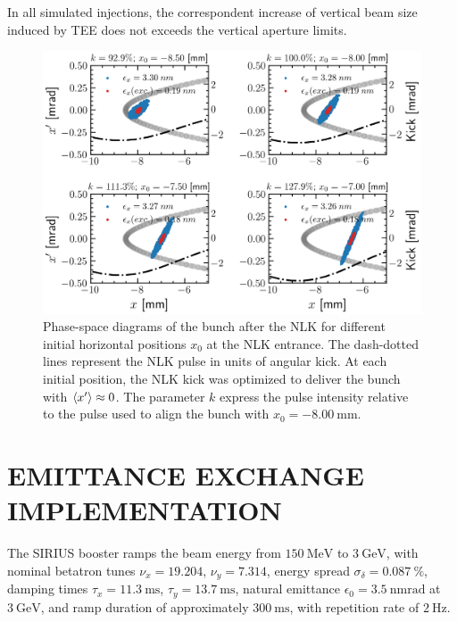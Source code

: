 \documentclass[a4paper,
               keeplastbox,   %
              nospread,     %
               ]{jacow}
\begin{document}
In all simulated injections, the correspondent increase of vertical beam size induced by TEE does not exceeds the vertical aperture limits.
\begin{figure}%
    \centering
    \includegraphics[width=\linewidth]{THPOPT056_f2.png}
    \caption{Phase-space diagrams of the bunch after the NLK for different initial horizontal positions $x_0$ at the NLK entrance. The dash-dotted lines represent the NLK pulse in units of angular kick. At each initial position, the NLK kick was optimized to deliver the bunch with $\expval{x'} \approx 0$. The parameter $k$ express the pulse intensity relative to the pulse used to align the bunch with $x_0 = - \SI{8.00}{\milli \meter}$.}
    \label{fig:phase_space}
\end{figure}
\section{EMITTANCE EXCHANGE IMPLEMENTATION}

The SIRIUS booster ramps the beam energy from $\SI{150}{\mega \electronvolt}$ to $\SI{3}{\giga\electronvolt}$, with nominal betatron tunes $\nu_x = 19.204$, $\nu_y = 7.314$, energy spread $\sigma_{\delta} = \SI{0.087}{\%}$, damping times $\tau_x=\SI{11.3}{\milli\second}$, $\tau_y = \SI{13.7}{\milli\second}$, natural emittance $\epsilon_0 = \SI{3.5}{\nano \meter\radian}$ at $\SI{3}{\giga\electronvolt}$, and ramp duration of approximately $\SI{300}{\milli\second}$, with repetition rate of $\SI{2}{\hertz}$.
\end{document}
